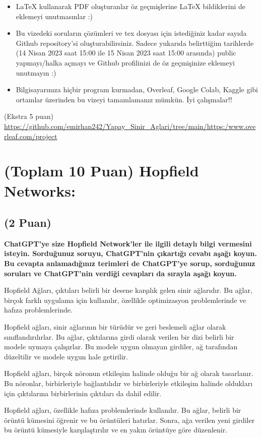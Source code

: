 \documentclass[11pt]{article}
\begin{document}
\begin{itemize}
    \item LaTeX kullanarak PDF oluşturanlar öz geçmişlerine LaTeX bildiklerini de eklemeyi unutmasınlar :)
    \item Bu vizedeki soruların çözümleri ve tex dosyası için istediğiniz kadar sayıda Github repository'si oluşturabilirsiniz. Sadece yukarıda belirttiğim tarihlerde (14 Nisan 2023 saat 15:00 ile 15 Nisan 2023 saat 15:00 arasında) public yapmayı/halka açmayı ve Github profilinizi de öz geçmişinize eklemeyi unutmayın :)
    \item Bilgisayarınıza hiçbir program kurmadan, Overleaf, Google Colab, Kaggle gibi ortamlar üzerinden bu vizeyi tamamlamanız mümkün. İyi çalışmalar!!
\end{itemize}

(Ekstra 5 puan) \url{https://github.com/emirhan242/Yapay_Sinir_Aglari/tree/main/https:/www.overleaf.com/project}

\newpage
\section{(Toplam 10 Puan) Hopfield Networks:}

\subsection{(2 Puan)} \textbf{ChatGPT’ye size Hopfield Network’ler ile ilgili detaylı bilgi vermesini isteyin. Sorduğunuz soruyu, ChatGPT'nin çıkartığı cevabı aşağı koyun. Bu cevapta anlamadığınız terimleri de ChatGPT’ye sorup, sorduğunuz soruları ve ChatGPT’nin verdiği cevapları da sırayla aşağı koyun.}

Hopfield Ağları, çıktıları belirli bir desene karşılık gelen sinir ağlarıdır. Bu ağlar, birçok farklı uygulama için kullanılır, özellikle optimizasyon problemlerinde ve hafıza problemlerinde.

Hopfield ağları, sinir ağlarının bir türüdür ve geri beslemeli ağlar olarak sınıflandırılırlar. Bu ağlar, çıktılarına girdi olarak verilen bir dizi belirli bir modele uymaya çalışırlar. Bu modele uygun olmayan girdiler, ağ tarafından düzeltilir ve modele uygun hale getirilir.

Hopfield ağları, birçok nöronun etkileşim halinde olduğu bir ağ olarak tasarlanır. Bu nöronlar, birbirleriyle bağlantılıdır ve birbirleriyle etkileşim halinde oldukları için çıktılarına birbirlerinin çıktıları da dahil edilir.

Hopfield ağları, özellikle hafıza problemlerinde kullanılır. Bu ağlar, belirli bir örüntü kümesini öğrenir ve bu örüntüleri hatırlar. Sonra, ağa verilen yeni girdiler bu örüntü kümesiyle karşılaştırılır ve en yakın örüntüye göre düzenlenir.
\end{document}
